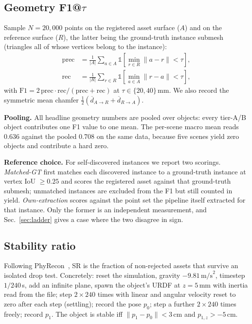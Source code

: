 \subsection{Geometry F1@$\tau$}
Sample $N=20{,}000$ points on the registered asset surface ($A$) and on
the reference surface ($R$), the latter being the ground-truth instance
submesh (triangles all of whose vertices belong to the instance):
\begin{align}
\mathrm{prec} &= \tfrac{1}{|A|}\textstyle\sum_{a \in A}
   \mathbb{1}\!\left[\min_{r\in R}\|a-r\| < \tau\right],\\
\mathrm{rec}  &= \tfrac{1}{|R|}\textstyle\sum_{r \in R}
   \mathbb{1}\!\left[\min_{a\in A}\|r-a\| < \tau\right],
\end{align}
with $\text{F1} = 2\,\mathrm{prec}\cdot\mathrm{rec}/(\mathrm{prec}+\mathrm{rec})$
at $\tau\in\{20,40\}$\,mm. We also record the symmetric mean chamfer
$\tfrac{1}{2}(\overline{d}_{A\to R} + \overline{d}_{R\to A})$.

\textbf{Pooling.} All headline geometry numbers are pooled over objects:
every tier-A/B object contributes one F1 value to one mean. The per-scene
macro mean reads 0.636 against the pooled 0.708 on the same data, because
five scenes yield zero objects and contribute a hard zero.

\textbf{Reference choice.} For self-discovered instances we report two
scorings. \emph{Matched-GT} first matches each discovered instance to a
ground-truth instance at vertex IoU $\geq0.25$ and scores the registered
asset against that ground-truth submesh; unmatched instances are excluded
from the F1 but still counted in yield. \emph{Own-extraction} scores
against the point set the pipeline itself extracted for that instance.
Only the former is an independent measurement, and
Sec.~\ref{sec:ladder} gives a case where the two disagree in sign.

\subsection{Stability ratio}
Following PhyRecon~\cite{phyrecon}, SR is the fraction of non-rejected
assets that survive an isolated drop test. Concretely: reset the
simulation, gravity $-9.81\,\text{m/s}^2$, timestep $1/240$\,s, add an
infinite plane, spawn the object's URDF at $z=5$\,mm with inertia read
from the file; step $2\times240$ times with linear and angular velocity
reset to zero after each step (settling); record the pose $p_0$; step a
further $2\times240$ times freely; record $p_1$. The object is stable iff
$\|p_1-p_0\| < 3$\,cm and $p_{1,z} > -5$\,cm.

